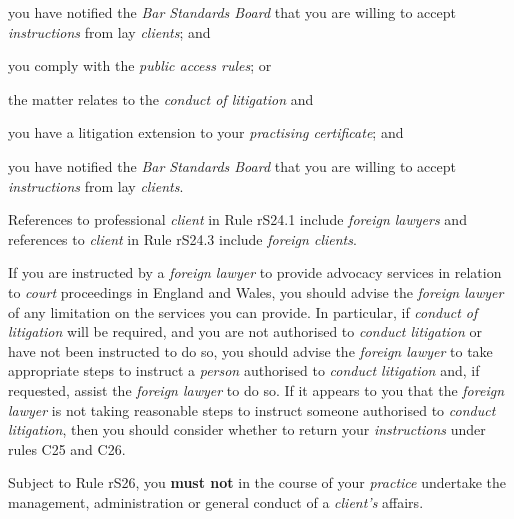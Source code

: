 \item you have notified the \emph{Bar Standards Board} that you are
willing to accept \emph{instructions} from lay \emph{clients}; and

\item you comply with the \emph{public access rules}; or
\lr
\item the matter relates to the \emph{conduct of litigation} and
\rl
\item you have a litigation extension to your \emph{practising
certificate}; and

\item you have notified the \emph{Bar Standards Board} that you are
willing to accept \emph{instructions} from lay \emph{clients}.\lr\la\ln




References to professional \emph{client} in Rule rS24.1 include
\emph{foreign lawyers} and references to \emph{client} in Rule rS24.3
include \emph{foreign clients}.


If you are instructed by a \emph{foreign lawyer} to provide advocacy
services in relation to \emph{court} proceedings in England and Wales,
you should advise the \emph{foreign lawyer} of any limitation on the
services you can provide. In particular, if \emph{conduct of litigation}
will be required, and you are not authorised to \emph{conduct
litigation} or have not been instructed to do so, you should advise the
\emph{foreign lawyer} to take appropriate steps to instruct a
\emph{person} authorised to \emph{conduct litigation} and, if requested,
assist the \emph{foreign lawyer} to do so. If it appears to you that the
\emph{foreign lawyer} is not taking reasonable steps to instruct someone
authorised to \emph{conduct litigation}, then you should consider
whether to return your \emph{instructions} under rules C25 and C26.




Subject to Rule rS26, you \textcolor{myred}{\textbf{must not }}in the course of your \emph{practice}
undertake the management, administration or general conduct of a
\emph{client's} affairs.


